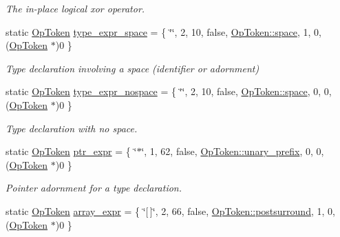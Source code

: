 \begin{DoxyCompactItemize}
\begin{DoxyCompactList}\small\item\em The {\itshape in-\/place} {\itshape logical} {\itshape xor} operator. \end{DoxyCompactList}\item 
static \mbox{\hyperlink{class_op_token}{Op\+Token}} \mbox{\hyperlink{class_print_c_a2f5109e6fdfdf2ab4d6b30749a2311a2}{type\+\_\+expr\+\_\+space}} = \{ \char`\"{}\char`\"{}, 2, 10, false, \mbox{\hyperlink{class_op_token_af41c7f108d5662ede7765c5a6c44eaffa07bc235399849635f28ca7caaaebb1a4}{Op\+Token\+::space}}, 1, 0, (\mbox{\hyperlink{class_op_token}{Op\+Token}} $\ast$)0 \}
\begin{DoxyCompactList}\small\item\em Type declaration involving a space (identifier or adornment) \end{DoxyCompactList}\item 
static \mbox{\hyperlink{class_op_token}{Op\+Token}} \mbox{\hyperlink{class_print_c_afb18c444eb771f284d723e780dd5521b}{type\+\_\+expr\+\_\+nospace}} = \{ \char`\"{}\char`\"{}, 2, 10, false, \mbox{\hyperlink{class_op_token_af41c7f108d5662ede7765c5a6c44eaffa07bc235399849635f28ca7caaaebb1a4}{Op\+Token\+::space}}, 0, 0, (\mbox{\hyperlink{class_op_token}{Op\+Token}} $\ast$)0 \}
\begin{DoxyCompactList}\small\item\em Type declaration with no space. \end{DoxyCompactList}\item 
static \mbox{\hyperlink{class_op_token}{Op\+Token}} \mbox{\hyperlink{class_print_c_a569fcb3559048223bde66129130376a5}{ptr\+\_\+expr}} = \{ \char`\"{}$\ast$\char`\"{}, 1, 62, false, \mbox{\hyperlink{class_op_token_af41c7f108d5662ede7765c5a6c44eaffa0d809c13f66611247b81856fc9e68289}{Op\+Token\+::unary\+\_\+prefix}}, 0, 0, (\mbox{\hyperlink{class_op_token}{Op\+Token}} $\ast$)0 \}
\begin{DoxyCompactList}\small\item\em Pointer adornment for a type declaration. \end{DoxyCompactList}\item 
static \mbox{\hyperlink{class_op_token}{Op\+Token}} \mbox{\hyperlink{class_print_c_a4e61d18c5dc768e42f9be42619d63b37}{array\+\_\+expr}} = \{ \char`\"{}\mbox{[}$\,$\mbox{]}\char`\"{}, 2, 66, false, \mbox{\hyperlink{class_op_token_af41c7f108d5662ede7765c5a6c44eaffa82a30068870b08542e958e828d6464fa}{Op\+Token\+::postsurround}}, 1, 0, (\mbox{\hyperlink{class_op_token}{Op\+Token}} $\ast$)0 \}

\end{DoxyCompactItemize}

